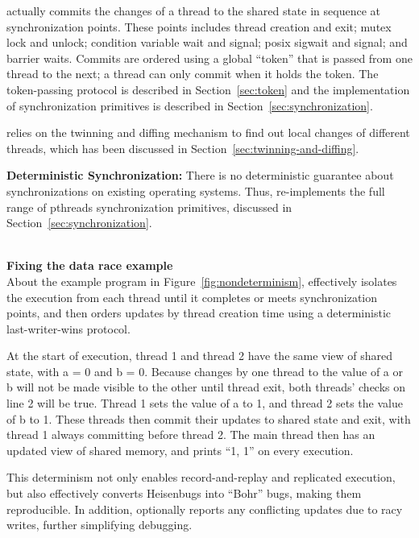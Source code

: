 \dthreads{} actually commits the changes of a thread to the shared state in sequence at synchronization points. These points includes thread creation and exit; mutex lock and unlock; condition variable wait and signal; posix sigwait and signal; and barrier waits. Commits are ordered using a global ``token'' that is passed from one thread to the next; a thread can only commit when it holds the token.  The token-passing protocol is described in Section~\ref{sec:token} and the implementation of synchronization primitives is described in Section~\ref{sec:synchronization}.

\dthreads{} relies on the twinning and diffing mechanism to find out local changes of different threads, which has been discussed in Section~\ref{sec:twinning-and-diffing}. 

\textbf{Deterministic Synchronization:}
There is no deterministic guarantee about synchronizations on existing operating systems. Thus, \dthreads{} re-implements the full range of pthreads synchronization primitives, discussed in Section~\ref{sec:synchronization}. 

\hspace{1em} \\
\noindent
\textbf{Fixing the data race example} \\
About the example program in Figure~\ref{fig:nondeterminism},  \dthreads{} effectively isolates the execution from each thread until it completes or meets synchronization points, and then orders updates by thread creation time using a deterministic last-writer-wins protocol.

At the start of execution, thread 1 and thread 2 have the same
view of shared state, with a = 0 and b = 0. Because changes by
one thread to the value of a or b will not be made visible to the other until thread exit, both threads’ checks on line 2 will be true. Thread 1 sets the value of a to 1, and thread 2 sets the value of b to 1. These threads then commit their updates to shared state and exit, with thread 1 always committing before thread 2. The main thread then has an updated view of shared memory, and prints “1, 1” on every execution.

This determinism not only enables record-and-replay and replicated execution, but also effectively converts Heisenbugs into “Bohr” bugs, making them reproducible. In addition, \dthreads{} optionally reports any conflicting updates due to racy writes, further simplifying debugging.
